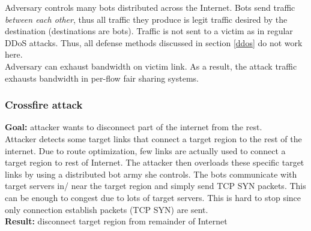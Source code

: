 \documentclass[11pt,oneside,a4paper]{article}
\begin{document}
Adversary controls many bots distributed across the Internet. Bots send traffic \textit{between each other}, thus all traffic they produce is legit traffic desired by the destination (destinations are bots). Traffic is not sent to a victim as in regular DDoS attacks. Thus, all defense methods discussed in section \ref{ddos} do not work here.\\
Adversary can exhaust bandwidth on victim link. As a result, the attack traffic exhausts bandwidth in per-flow fair sharing systems.

\subsubsection{Crossfire attack}

\textbf{Goal:} attacker wants to disconnect part of the internet from the rest.\\
Attacker detects some target links that connect a target region to the rest of the internet. Due to route optimization, few links are actually used to connect a
target region to rest of Internet. The attacker then overloads these specific target links by using a distributed bot army she controls. The bots communicate with target servers in/ near the target region and simply send TCP SYN packets. This can be enough to congest due to lots of target servers. This is hard to stop since only connection establish packets (TCP SYN) are sent.\\
\textbf{Result:} disconnect target region from remainder of Internet
\end{document}
